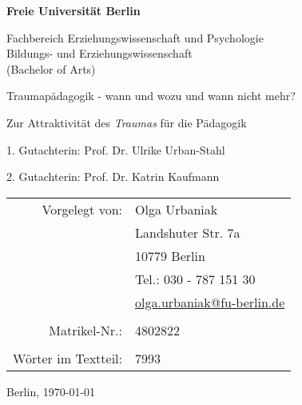 \documentclass[11pt,a4paper]{article}
\newcommand{\mailto}[1]{\href{mailto:#1}{#1}}
\begin{document}
\pagestyle{empty}
\begin{center}
\LARGE
\textbf{Freie Universität Berlin}
\vspace{4mm}

\normalsize
Fachbereich Erziehungswissenschaft und Psychologie \\
Bildungs- und Erziehungswissenschaft \\
(Bachelor of Arts)

\vspace{2mm}

\huge
Traumapädagogik - wann und wozu und wann nicht mehr?

\vspace{2mm}

\Large
Zur Attraktivität des \textit{Traumas} für die Pädagogik
\end{center}

\vspace{10mm}

1. Gutachterin: Prof. Dr. Ulrike Urban-Stahl

2. Gutachterin: Prof. Dr. Katrin Kaufmann

\vspace{17mm}

\begin{center}
\begin{tabular}{rl}
  Vorgelegt von: & Olga Urbaniak \\
  & Landshuter Str. 7a \\
  & 10779 Berlin \\
  & Tel.: 030 - 787 151 30 \\
  & \mailto{olga.urbaniak@fu-berlin.de} \\
  \\
  Matrikel-Nr.: & 4802822 \\
  \\
  W\"orter im Textteil: & 7993 \\
\end{tabular}
\end{center}

\vspace{2cm}

Berlin, \today

\clearpage

\setcounter{page}{1}
\tableofcontents
\clearpage

\listoffigures
\clearpage

\pagestyle{fancy}
\fancyhf{} %
\fancyhead[L]{\textcolor{gray}{Traumapädagogik}} %
\fancyhead[C]{} %
\fancyhead[R]{\textcolor{gray}{Olga Urbaniak}} %
\fancyfoot[C]{\thepage}








\setcounter{secnumdepth}{0}

\appendix

\end{document}
